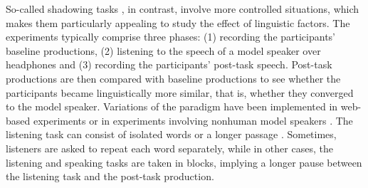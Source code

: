 \documentclass[output=paper,
modfonts
]{langscibook}
\begin{document}
So-called shadowing tasks \citep{goldinger_echoes_1998,shockley_imitation_2004,babel_dialect_2010}, in contrast, involve more controlled situations, which makes them particularly appealing to study the effect of linguistic factors. The experiments typically comprise three phases: (1) recording the participants' baseline productions, (2) listening to the speech of a model speaker over headphones and (3) recording the participants' post-task speech. Post-task productions are then compared with baseline productions to see whether the participants became linguistically more similar, that is, whether they converged to the model speaker. Variations of the paradigm have been implemented in web-based experiments \citep{weatherholtz_socially-mediated_2014} or in experiments involving nonhuman model speakers \citep[e.g.][]{beckner_participants_2016}.
% 
% 
% 
%
The listening task can consist of isolated words \citep[e.g.][]{goldinger_echoes_1998} or a longer passage \citep[e.g.][]{yu_phonetic_2013,weatherholtz_socially-mediated_2014}. Sometimes, listeners are asked to repeat each word separately, while in other cases, the listening and speaking tasks are taken in blocks, implying a longer pause between the listening task and the post-task production.
\end{document}

